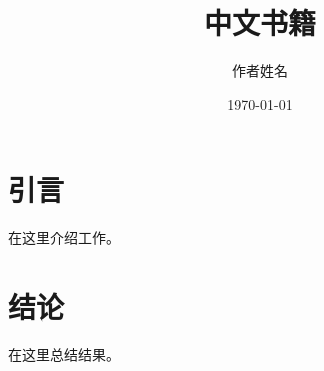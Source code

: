 \documentclass[11pt]{book}
\title{中文书籍}
\author{作者姓名}
\date{\today}
\begin{document}
\maketitle
\tableofcontents

\chapter{引言}
在这里介绍工作。

\chapter{结论}
在这里总结结果。
\end{document}
